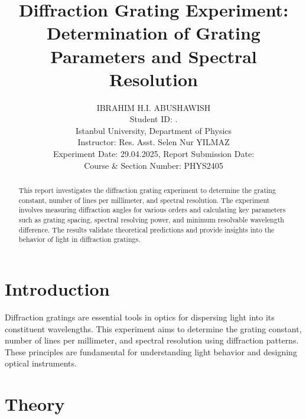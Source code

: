 \documentclass[journal]{IEEEtran}
\begin{document}
\title{Diffraction Grating Experiment: Determination of Grating Parameters and Spectral Resolution}
\author{IBRAHIM H.I. ABUSHAWISH \\

{\small Student ID: \hspace{1.5cm}. \\ 
Istanbul University, Department of Physics \\
Instructor: Res. Asst. Selen Nur YILMAZ\\
Experiment Date: 29.04.2025, Report Submission Date: \\
Course \& Section Number: PHYS2405}}


\maketitle

\begin{abstract}
    This report investigates the diffraction grating experiment to determine the grating constant, number of lines per millimeter, and spectral resolution. The experiment involves measuring diffraction angles for various orders and calculating key parameters such as grating spacing, spectral resolving power, and minimum resolvable wavelength difference. The results validate theoretical predictions and provide insights into the behavior of light in diffraction gratings.
\end{abstract}

\section{Introduction}
Diffraction gratings are essential tools in optics for dispersing light into its constituent wavelengths. This experiment aims to determine the grating constant, number of lines per millimeter, and spectral resolution using diffraction patterns. These principles are fundamental for understanding light behavior and designing optical instruments.

\section{Theory}
\end{document}
